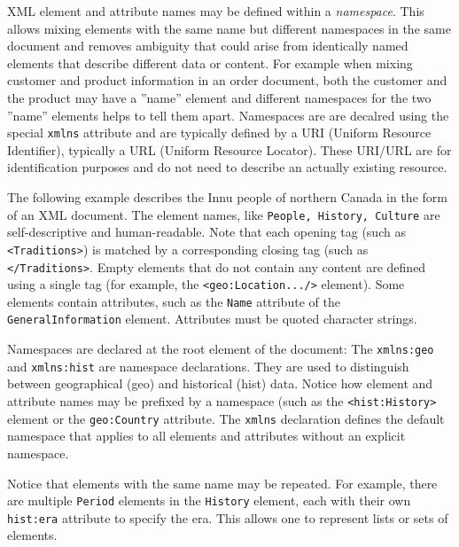 XML element and attribute names may be defined within a \emph{namespace}. This allows mixing elements with the same name but different namespaces in the same document and removes ambiguity that could arise from identically named elements that describe different data or content. For example when mixing customer and product information in an order document, both the customer and the product may have a ''name'' element and different namespaces for the two ''name'' elements helps to tell them apart. Namespaces are are decalred using the special \texttt{xmlns} attribute and are typically defined by a URI (Uniform Resource Identifier), typically a URL (Uniform Resource Locator). These URI/URL are for identification purposes and do not need to describe an actually existing resource.

The following example describes the Innu people of northern Canada in the form of an XML document. The element names, like \texttt{People, History, Culture} are self-descriptive and human-readable. Note that each opening tag (such as \texttt{<Traditions>}) is matched by a corresponding closing tag (such as \texttt{</Traditions>}. Empty elements that do not contain any content are defined using a single tag (for example, the \texttt{<geo:Location.../>} element). Some elements contain attributes, such as the \texttt{Name} attribute of the \texttt{GeneralInformation} element. Attributes must be quoted character strings.

Namespaces are declared at the root element of the document: The \texttt{xmlns:geo} and \texttt{xmlns:hist} are namespace declarations. They are used to distinguish between geographical (geo) and historical (hist) data. Notice how element and attribute names may be prefixed by a namespace (such as the \texttt{<hist:History>} element or the \texttt{geo:Country} attribute. The \texttt{xmlns} declaration defines the default namespace that applies to all elements and attributes without an explicit namespace.

Notice that elements with the same name may be repeated. For example, there are multiple \texttt{Period} elements in the \texttt{History} element, each with their own \texttt{hist:era} attribute to specify the era. This allows one to represent lists or sets of elements. 

